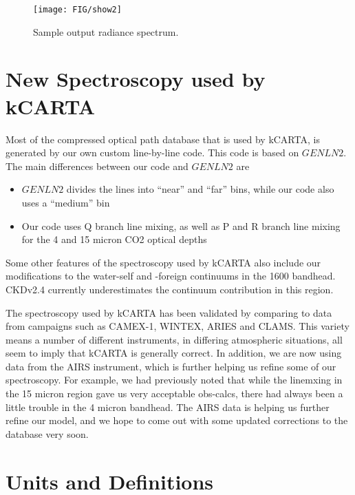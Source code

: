 \documentclass[12pt]{article}
\newcommand{\kc}{\textsf{kCARTA}\xspace}
\begin{document}
\begin{figure}
\texttt{[image: FIG/show2]}
\caption{Sample output radiance spectrum.}
\label{sampleplot}
\end{figure}


\section{New Spectroscopy used by \kc}
Most of the compressed optical path database that is used by \kc, is generated
by our own custom line-by-line code. This code is based on $GENLN2$. The main
differences between our code and $GENLN2$ are
\begin{itemize}
\item $GENLN2$ divides the lines into ``near'' and ``far'' bins, while our
      code also uses a ``medium'' bin
\item Our code uses Q branch line mixing, as well as P and R branch line mixing
      for the 4 and 15 micron CO2 optical depths
\end{itemize}

Some other features of the spectroscopy used by \kc also include our 
modifications to the water-self and -foreign continuums in the 1600 \wn 
bandhead. CKDv2.4 currently underestimates the continuum contribution in this 
region.

The spectroscopy used by \kc has been validated by comparing to data from 
campaigns such as CAMEX-1, WINTEX, ARIES and CLAMS. This variety means a 
number of different instruments, in differing atmospheric situations, all seem
to imply that \kc is generally correct. In addition, we are now using data from
the AIRS instrument, which is further helping us refine some of our 
spectroscopy. For example, we had previously noted that while the linemxing 
in the 15 micron region gave us very acceptable obs-calcs, there had always 
been a little trouble in the 4 micron bandhead. The AIRS data is helping us 
further refine our model, and we hope to come out with some updated corrections
to the database very soon.

\section{Units and Definitions}
\end{document}

